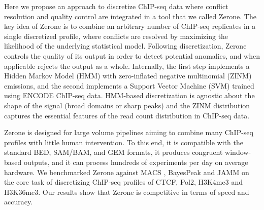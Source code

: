 \documentclass{bioinfo}
\begin{document}
Here we propose an approach to discretize ChIP-seq data where conflict
resolution and quality control are integrated in a tool that we called
Zerone. The key idea of Zerone is to combine an arbitrary number of
ChIP-seq replicates in a single discretized profile, where conflicts are
resolved by maximizing the likelihood of the underlying statistical model.
Following discretization, Zerone controls the quality of its output in
order to detect potential anomalies, and when applicable rejects the
output as a whole. Internally, the first step implements a Hidden Markov
Model (HMM) with zero-inflated negative multinomial (ZINM) emissions, and
the second implements a Support Vector Machine (SVM) trained using ENCODE
ChIP-seq data. HMM-based discretization is agnostic about
the shape of the signal (broad domains or sharp peaks) and the ZINM
distribution captures the essential features of the read count
distribution in ChIP-seq data.

Zerone is designed for large volume pipelines aiming to combine many
ChIP-seq profiles with little human intervention. To this end, it is
compatible with the standard BED, SAM/BAM, and GEM formats,
it produces congruent window-based outputs, and it can process hundreds
of experiments per day on average hardware. We benchmarked Zerone against
MACS \citep{pmid18798982}, BayesPeak \citep{pmid19772557} and
JAMM \citep{pmid25223640} on the core task of discretizing ChIP-seq
profiles of CTCF, Pol2, H3K4me3 and H3K36me3. Our results show that Zerone is
competitive in terms of speed and accuracy.
\end{document}
